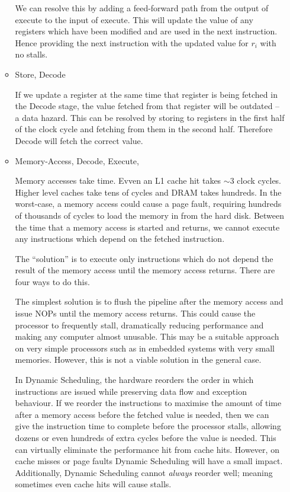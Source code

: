 \documentclass[10pt,\jkfside,a4paper]{article}
\begin{document}
\begin{enumerate}
\begin{itemize}
We can resolve this by adding a feed-forward path from the output of execute
to the input of execute. This will update the value of any registers which
have been modified and are used in the next instruction. Hence providing
the next instruction with the updated value for $r_i$ with no stalls.

\item Store, Decode

If we update a register at the same time that register is being fetched in
the Decode stage, the value fetched from that register will be outdated -- a
data hazard. This can be resolved by storing to registers in the first half
of the clock cycle and fetching from them in the second half. Therefore
Decode will fetch the correct value.

\item Memory-Access, Decode, Execute,

Memory accesses take time. Evven an L1 cache hit takes $\sim 3$ clock cycles.
Higher level caches take tens of cycles and DRAM takes hundreds. In the
worst-case, a memory access could cause a page fault, requiring hundreds of
thousands of cycles to load the memory in from the hard disk. Between the
time that a memory access is started and returns, we cannot execute any
instructions which depend on the fetched instruction.

The ``solution'' is to execute only instructions which do not depend the
result of the memory access until the memory access returns. There are four
ways to do this.

The simplest solution is to flush the pipeline after the memory access and
issue NOPs until the memory access returns. This could cause the processor
to frequently stall, dramatically reducing performance and making any
computer almost unusable. This may be a suitable approach on very simple
processors such as in embedded systems with very small memories. However,
this is not a viable solution in the general case.

In Dynamic Scheduling, the hardware reorders the order in which instructions
are issued while preserving data flow and exception behaviour. If we reorder
the instructions to maximise the amount of time after a memory access before
the fetched value is needed, then we can give the instruction time to complete
before the processor stalls, allowing dozens or even hundreds of extra cycles
before the value is needed. This can virtually eliminate the performance hit
from cache hits. However, on cache misses or page faults Dynamic Scheduling
will have a small impact. Additionally, Dynamic Scheduling cannot
\textit{always} reorder well; meaning sometimes even cache hits will cause
stalls.


\end{itemize}
\end{enumerate}
\end{document}

